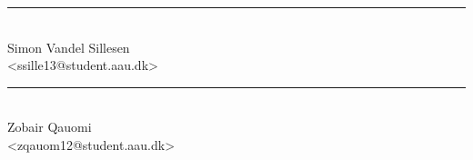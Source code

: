 \noindent
\begin{minipage}[b]{0.45\textwidth}
 \centering
 \rule{\textwidth}{0.5pt}\\
  Simon Vandel Sillesen\\
 {\footnotesize <ssille13@student.aau.dk>}
\end{minipage}
%
\hfill
%
\begin{minipage}[b]{0.45\textwidth}
 \centering
 \rule{\textwidth}{0.5pt}\\
  Zobair Qauomi\\
 {\footnotesize <zqauom12@student.aau.dk>}
\end{minipage}
\vspace{3\baselineskip}
